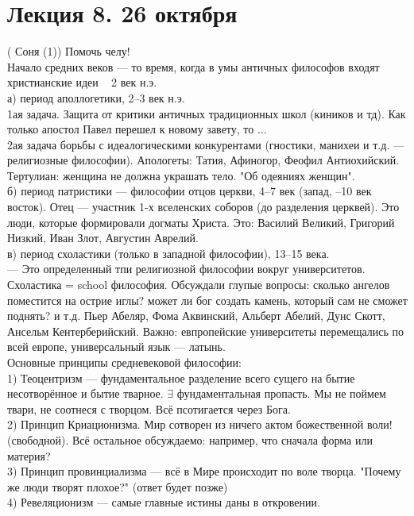 \documentclass[a4paper,12pt]{article}
\begin{document}
\section{Лекция 8. 26 октября}
( Соня (1))
Помочь челу! \\
Начало средних веков --- то время, когда в умы античных философов входят христианские идеи ~ 2 век н.э.\\
а) период аполлогетики, 2--3 век н.э.\\
1ая задача. Защита от критики античных традиционных школ (киников и тд). Как только апостол Павел перешел к новому завету, то ...\\
2ая задача борьбы с идеалогическими конкурентами (гностики, манихеи и т.д. --- религиозные философии). Апологеты: Татия, Афиногор, Феофил Антиохийский. Тертулиан: женщина не должна украшать тело. "Об одеяниях женщин".\\
б) период патристики --- философии отцов церкви, 4--7 век (запад, --10 век восток). Отец --- участник 1-х вселенских соборов (до разделения церквей). Это люди, которые формировали догматы Христа. Это: Василий Великий, Григорий Низкий, Иван Злот, Августин Аврелий.\\
в) период схоластики (только в западной философии), 13--15 века.\\
--- Это определенный тпи религиозной философии вокруг университетов. Схоластика = school философия. Обсуждали глупые вопросы: сколько ангелов поместится на острие иглы? может ли бог создать камень, который сам не сможет поднять? и т.д. Пьер Абеляр, Фома Аквинский, Альберт Абелий, Дунс Скотт, Ансельм Кентерберийский. Важно: евпропейские университеты перемещались по всей европе, универсальный язык --- латынь. \\
Основные принципы средневековой философии:\\
1) Теоцентризм --- фундаментальное разделение всего сущего на бытие несотворённое и бытие тварное. $\exists$ фундаментальная пропасть. Мы не поймем твари, не соотнеся с творцом. Всё псотигается через Бога.\\
2) Принцип Криационизма. Мир сотворен из ничего актом божественной воли! (свободной). Всё остальное обсуждаемо: например, что сначала форма или материя?\\
3) Принцип провинциализма --- всё в Мире происходит по воле творца. "Почему же люди творят плохое?" (ответ будет позже) \\
4) Ревеляционизм --- самые главные истины даны в откровении.
\end{document}

